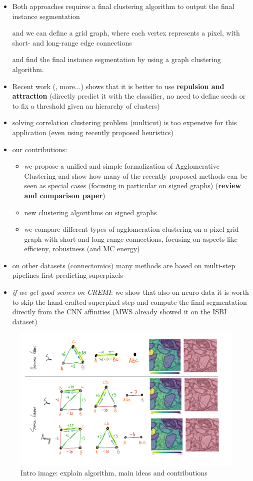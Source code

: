 \begin{itemize}
\item Both approaches requires a final clustering algorithm to output the final instance segmentation 

 and we can define a grid graph, where each vertex represents a pixel, with short- and long-range edge connections 

 and find the final instance segmentation by using a graph clustering algorithm.

\item Recent work (\cite{wolf2018mutex}, more...) shows that it is better to use \textbf{repulsion and attraction} (directly predict it with the classifier, no need to define seeds or to fix a threshold given an hierarchy of clusters)
\item solving correlation clustering problem (multicut) is too expensive for this application (even using recently proposed heuristics)
\item our contributions:
\begin{itemize}
\item we propose a unified and simple formalization of Agglomerative Clustering and show how many of the recently proposed methods can be seen as special cases (focusing in particular on signed graphs) (\textbf{review and comparison paper})
\item new clustering algorithms on signed graphs
\item we compare different types of agglomeration clustering on a pixel grid graph with short and long-range connections, focusing on aspects like efficieny, robustness (and MC energy) 

\end{itemize}
\item on other datasets (connectomics) many methods are based on multi-step pipelines first predicting superpixels
\item \textit{if we get good scores on CREMI}: we show that also on neuro-data it is worth to skip the hand-crafted superpixel step and compute the final segmentation directly from the CNN affinities (MWS already showed it on the ISBI dataset)

\end{itemize}


\begin{figure}[t]
\centering
\includegraphics[width=\textwidth,trim=0.4in 1.2in 0.in 0.05in,clip]{./figs/intro_image.jpg} %
\caption{\small 
Intro image: explain algorithm, main ideas and contributions
\label{fig:intro_figure}}
\end{figure}
